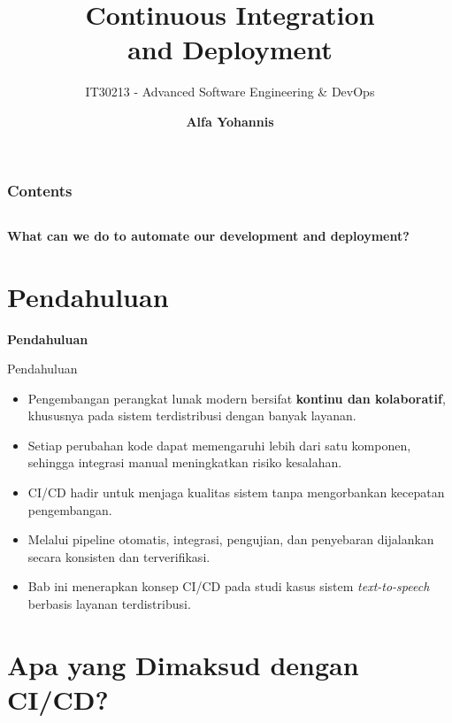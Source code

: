 \documentclass[aspectratio=169, table]{beamer}
\subtitle{IT30213 - Advanced Software Engineering \& DevOps}
\title{\Huge Continuous Integration \\
	and Deployment\vspace{8pt}}
\author{\textbf{Alfa Yohannis}}
\begin{document}
	
	\frame{\titlepage}
	

	\begin{frame}[fragile]
		\frametitle{Contents}
		\vspace{20pt}
		\begin{columns}[t]
			\tableofcontents[sections={1-5}]
			
			\tableofcontents[sections={6-20}]
		\end{columns}
	\end{frame}
	
	\begin{frame}{\hfill}
		\centering
		\Huge{\textbf{What can we do to automate our development and deployment?}}
	\end{frame}
	
\section{Pendahuluan}

	\begin{frame}{\hfill}
		\centering
		\Huge{\textbf{Pendahuluan}}
	\end{frame}

\begin{frame}{Pendahuluan}
	\vspace{6pt}
	\begin{itemize}
		\item Pengembangan perangkat lunak modern bersifat \textbf{kontinu dan kolaboratif}, khususnya pada sistem terdistribusi dengan banyak layanan.
		\item Setiap perubahan kode dapat memengaruhi lebih dari satu komponen, sehingga integrasi manual meningkatkan risiko kesalahan.
		\item CI/CD hadir untuk menjaga kualitas sistem tanpa mengorbankan kecepatan pengembangan.
		\item Melalui pipeline otomatis, integrasi, pengujian, dan penyebaran dijalankan secara konsisten dan terverifikasi.
		\item Bab ini menerapkan konsep CI/CD pada studi kasus sistem \textit{text-to-speech} berbasis layanan terdistribusi.
	\end{itemize}
\end{frame}


\section{Apa yang Dimaksud dengan CI/CD?}
\end{document}

